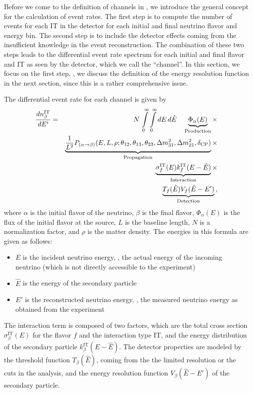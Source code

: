 Before we come to the definition of channels in \AEDL , we introduce the general concept for the calculation of event rates. The first step is to
compute the number of events for each IT in the detector for each 
initial and final neutrino flavor and energy bin. The second step is to include the detector effects coming from the insufficient knowledge in the event reconstruction.
The combination of these two steps leads to the differential event rate spectrum for each initial and final flavor and IT as seen by the detector, which we call the ``channel''. In this section, we focus on the
 first step, \ie , we discuss the definition of the energy resolution function in the next section, since this is a rather comprehensive issue.

The differential event rate for each channel is given by
\begin{eqnarray}
\label{eq:master_event}
\frac{dn_{\beta}^{\text{IT}}}{dE'}=&&N\,\int\limits_0^\infty \int\limits_0^\infty dE\,d\hat{E}\quad
\underbrace{\Phi_{\alpha} (E)}_{\mathrm{Production}} \times \nonumber\\
&&\underbrace{\frac{1}{L^2} P_{(\alpha\rightarrow\beta)}(E,L,\rho;\theta_{12},
\theta_{13},\theta_{23},
\Delta m^2_{31},\Delta m^2_{21},\delta_{\mathrm{CP}})}_{\mathrm{Propagation}}
\times \nonumber \\ &&\underbrace{\sigma^{\text{IT}}_f(E)
k_f^{\text{IT}}(E-\hat{E})}_{\mathrm{Interaction}} \times \nonumber \\
&&\underbrace{ T_f(\hat{E}) V_f(\hat{E}-E')}_{\mathrm{Detection}}\,,
\end{eqnarray}
where $\alpha$ is the initial flavor of the neutrino, 
$\beta$ is the final flavor, $\Phi_{\alpha} (E)$ is the flux of the 
initial flavor at the
source, $L$ is the baseline length, $N$ is a normalization factor, and 
$\rho$ is the matter density. The energies in this formula are given as follows:
\begin{itemize}
\item
 $E$ is the incident neutrino energy, \ie, the actual energy of the 
incoming neutrino (which is not directly accessible to the experiment)
\item
 $\hat{E}$ is the energy of the secondary particle
\item
 $E'$ is the reconstructed neutrino energy, \ie, the measured
neutrino energy as obtained from the experiment
\end{itemize}
The interaction term is composed of 
two factors, which are the total cross section 
$\sigma^{\text{IT}}_\beta(E)$ for the flavor $f$ and
the interaction type IT, and the energy distribution of the 
secondary particle $k_\beta^{\text{IT}}(E-\hat{E})$.
The detector properties are 
modeled by the threshold function $T_\beta(\hat{E})$, coming from the the 
limited resolution or the cuts in the analysis, and the energy resolution 
function $V_\beta(\hat{E}-E')$ of the secondary particle. 

